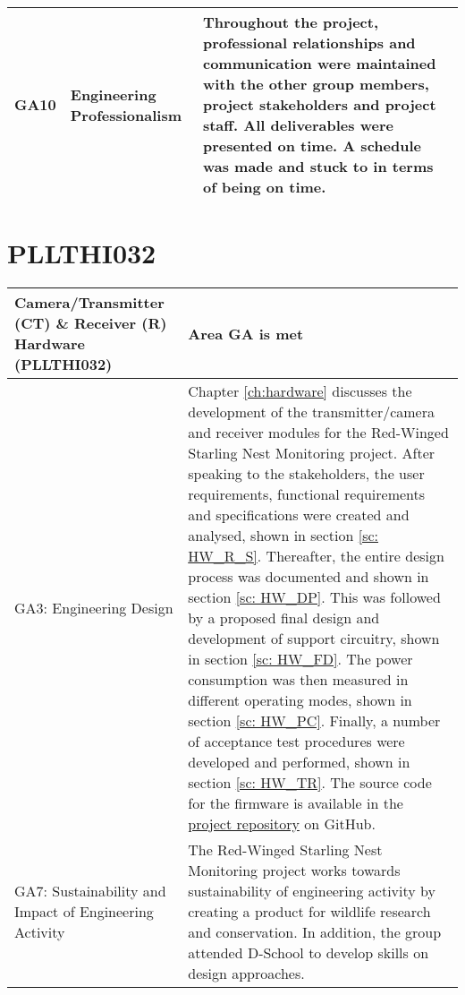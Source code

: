 \documentclass[class=report,11pt,crop=false]{standalone}
\begin{document}
\begin{tabularx}{\textwidth}{|p{} p{} X|}
    GA10 & Engineering Professionalism & Throughout the project, professional relationships and communication were maintained with the other group members, project stakeholders and project staff. All deliverables were presented on time. A schedule was made and stuck to in terms of being on time. \\ \hline


\end{tabularx}
\raggedright




\section{PLLTHI032}

\centering
\begin{tabularx}{\textwidth}{|p{} X|}

    \hline
    \textbf{Camera/Transmitter (CT) \& Receiver (R) Hardware (PLLTHI032)}  & \textbf{Area GA is met} \\ \hline

    GA3: Engineering Design & Chapter \ref{ch:hardware} discusses the development of the transmitter/camera and receiver modules for the Red-Winged Starling Nest Monitoring project. After speaking to the stakeholders, the user requirements, functional requirements and specifications were created and analysed, shown in section \ref{sc: HW_R_S}. Thereafter, the entire design process was documented and shown in section \ref{sc: HW_DP}. This was followed by a proposed final design and development of support circuitry, shown in section \ref{sc: HW_FD}. The power consumption was then measured in different operating modes, shown in section \ref{sc: HW_PC}. Finally, a number of acceptance test procedures were developed and performed, shown in section \ref{sc: HW_TR}. The source code for the firmware is available in the \href{https://github.com/rothdu/EEE4113F-Group13-2024}{project repository} on GitHub. \\ \hline

    GA7: Sustainability and Impact of Engineering Activity & The Red-Winged Starling Nest Monitoring project works towards sustainability of engineering activity by creating a product for wildlife research and conservation.  In addition, the group attended D-School to develop skills on design approaches. \\ \hline


\end{tabularx}
\end{document}
